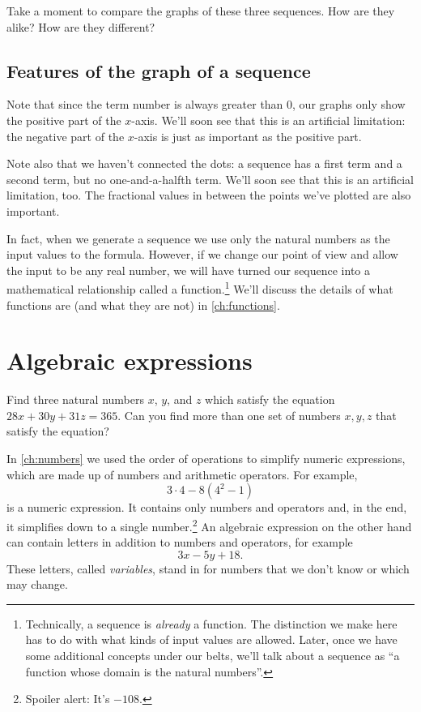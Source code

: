 Take a moment to compare the graphs of these three sequences. How are they alike? How are they different?

\subsection{Features of the graph of a sequence}

Note that since the term number is always greater than 0, our graphs only show the positive part of the $x$-axis. We'll soon see that this is an artificial limitation: the negative part of the $x$-axis is just as important as the positive part.

Note also that we haven't connected the dots: a sequence has a first term and a second term, but no one-and-a-halfth term. We'll soon see that this is an artificial limitation, too. The fractional values in between the points we've plotted are also important.

In fact, when we generate a sequence we use only the natural numbers as the input values to the formula. However, if we change our point of view and allow the input to be any real number, we will have turned our sequence into a mathematical relationship called a \gls{function}.\footnote{Technically, a sequence is \textit{already} a function. The distinction we make here has to do with what kinds of input values are allowed. Later, once we have some additional concepts under our belts, we'll talk about a sequence as ``a function whose domain is the natural numbers''.} We'll discuss the details of what functions are (and what they are not) in \cref{ch:functions}.


\section{Algebraic expressions}
\label{sec:algexpr}

\begin{boxedexplore}
Find three natural numbers $x$, $y$, and $z$ which satisfy the equation $28x + 30y + 31z = 365$. Can you find more than one set of numbers $x,y,z$ that satisfy the equation?
\end{boxedexplore}

In \cref{ch:numbers} we used the order of operations to simplify numeric expressions, which are made up of numbers and arithmetic operators. For example, \[3\cdot4-8(4^2-1)\] is a numeric expression. It contains only numbers and operators and, in the end, it simplifies down to a single number.\footnote{Spoiler alert: It's $-108$.} An \gls{algebraic expression} on the other hand can contain letters in addition to numbers and operators, for example \[3x - 5y + 18.\] These letters, called \textit{variables}, stand in for numbers that we don't know or which may change.

